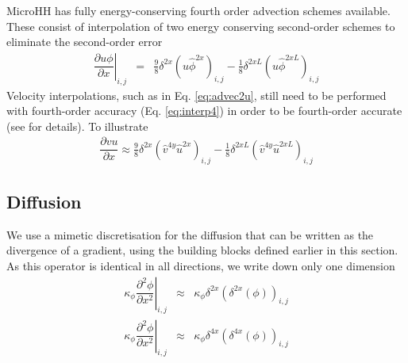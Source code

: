\documentclass[gmd]{copernicus}
\begin{document}
MicroHH has fully energy-conserving fourth order advection schemes \citep{Morinishi1998} available. These consist of interpolation of two energy conserving second-order schemes to eliminate the second-order error
\begin{eqnarray}
\left. \dfrac{\partial u \phi}{\partial x} \right|_{i,j} & = & \frac{9}{8} \delta^{2x} \left( u \widehat{\phi}^{2x} \right)_{i,j} 
                                                             - \frac{1}{8} \delta^{2xL} \left( u \widehat{\phi}^{2xL} \right)_{i,j}%
\end{eqnarray}
Velocity interpolations, such as in Eq. \ref{eq:advec2u}, still need to be performed with fourth-order accuracy (Eq. \ref{eq:interp4}) in order to  be fourth-order accurate (see \citet{Morinishi1998} for details). To illustrate
\begin{eqnarray}
\dfrac{\partial v u}{\partial x} \approx \frac{9}{8} \delta^{2x} \left( \widehat{v}^{4y} \widehat{u}^{2x} \right)_{i,j} 
                                       - \frac{1}{8} \delta^{2xL} \left( \widehat{v}^{4y} \widehat{u}^{2xL} \right)_{i,j}
\end{eqnarray}

\subsection{Diffusion}
We use a mimetic discretisation for the diffusion that can be written as the divergence of a gradient, using the building blocks defined earlier in this section. As this operator is identical in all directions, we write down only one dimension
\begin{eqnarray}
\left. \kappa_\phi \dfrac{\partial^2 \phi}{\partial x^2}\right|_{i,j} & \approx &
\kappa_\phi \delta^{2x} \left( \delta^{2x} \left( \phi \right) \right)_{i,j}\\
\left. \kappa_\phi \dfrac{\partial^2 \phi}{\partial x^2}\right|_{i,j} & \approx &
\kappa_\phi \delta^{4x} \left( \delta^{4x} \left( \phi \right) \right)_{i,j}
\end{eqnarray}
\end{document}
